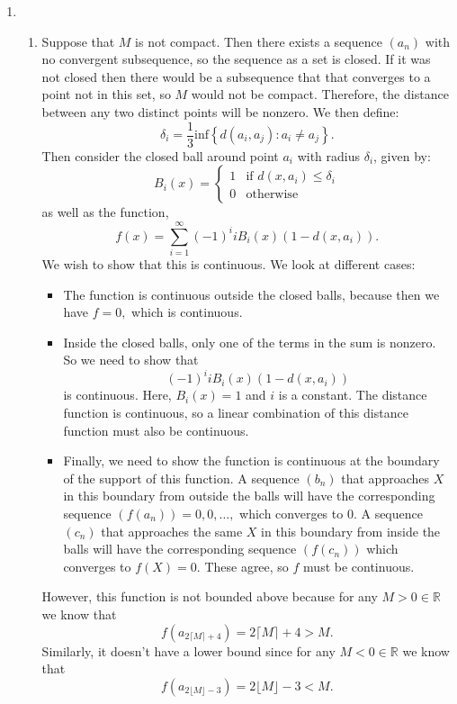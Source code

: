 \documentclass{article}
\numberwithin{equation}{section}
\begin{document}
\begin{enumerate}
\begin{enumerate}
    \end{enumerate}
    \newpage
    \item \begin{enumerate}[label=(\alph*)]
        \item Suppose that $M$ is not compact. Then there exists a sequence $(a_n)$ with no convergent subsequence, so the sequence as a set is closed. If it was not closed then there would be a subsequence that that converges to a point not in this set, so $M$ would not be compact. Therefore, the distance between any two distinct points will be nonzero. We then define:
        \begin{equation}
            \delta_i = \frac{1}{3}\text{inf}\left\{d(a_i,a_j):a_i \neq a_j\right\}.
        \end{equation} 
        Then consider the closed ball around point $a_i$ with radius $\delta_i$, given by:
        \begin{equation}
            B_i(x) = \begin{cases}
                1 & \text{if } d(x,a_i) \le \delta_i \\
                0 & \text{otherwise}
            \end{cases} 
        \end{equation}
        as well as the function,
        \begin{equation}
            f(x) = \sum_{i=1}^{\infty} (-1)^iiB_i(x)(1-d(x,a_i)).
        \end{equation}
        We wish to show that this is continuous. We look at different cases:
        \begin{itemize}
            \item The function is continuous outside the closed balls, because then we have $f=0,$ which is continuous.
            \item Inside the closed balls, only one of the terms in the sum is nonzero. So we need to show that 
            \begin{equation*}
                (-1)^iiB_i(x)(1-d(x,a_i))
            \end{equation*}
            is continuous. Here, $B_i(x)=1$ and $i$ is a constant. The distance function is continuous, so a linear combination of this distance function must also be continuous.
            \item Finally, we need to show the function is continuous at the boundary of the support of this function. A sequence $(b_n)$ that approaches $X$ in this boundary from outside the balls will have the corresponding sequence $(f(a_n))=0,0,\dots,$ which converges to $0.$ A sequence $(c_n)$ that approaches the same $X$ in this boundary from inside the balls will have the corresponding sequence $(f(c_n))$ which converges to $f(X)=0.$ These agree, so $f$ must be continuous.
        \end{itemize}
        However, this function is not bounded above because for any $M > 0\in \mathbb{R}$ we know that $$f(a_{2\lceil M\rceil + 4}) = 2\lceil M\rceil+4 > M.$$ Similarly, it doesn't have a lower bound since for any $M<0\in\mathbb{R}$ we know that 
        $$
f(a_{2\lfloor M\rfloor - 3}) = 2\lfloor M\rfloor - 3 < M.
        $$
        

\end{enumerate}
\end{enumerate}
\end{document}
